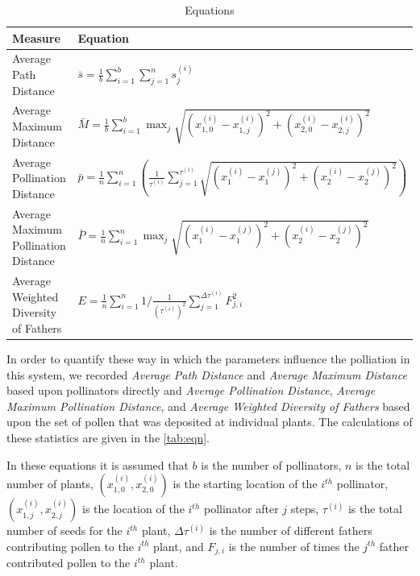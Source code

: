 \begin{table}[h]
\setlength{\extrarowheight}{10pt}
{\footnotesize
\begin{tabular}{|l|l|}
  \hline
  Measure & Equation \\[8pt] \hline   \hline
  Average Path Distance & $\bar{s} = \frac{1}{b} \sum_{i=1}^b \sum_{j=1}^n s^{\left(i\right)}_j$ \\[8pt] \hline
  Average Maximum Distance & $ \bar{M} = \frac{1}{b} \sum_{i=1}^b \max_j \sqrt{\left(x^{\left(i\right)}_{1,0}
- x^{\left(i\right)}_{1,j}\right)^2 +
      \left(x^{\left(i\right)}_{2,0} -
x^{\left(i\right)}_{2,j}\right)^2}  $ \\[8pt] \hline
  Average Pollination Distance & $ \bar{p} = \frac{1}{n} \sum_{i=1}^{n} \left(
\frac{1}{\tau^{\left(i\right)}} \sum_{j=1}^{\tau^{\left(i\right)}}
\sqrt{\left(x^{\left(i\right)}_1 -
x^{\left(j\right)}_1\right)^2 + \left(x^{\left(i\right)}_2 -
    x^{\left(j\right)}_2\right)^2}
    \right)  $ \\[12pt]  \hline
  Average Maximum Pollination Distance & $ \bar{P} = \frac{1}{n} \sum_{i=1}^{n} \max_j \sqrt{\left(x^{\left(i\right)}_1 -
x^{\left(j\right)}_1\right)^2 + \left(x^{\left(i\right)}_2 -
    x^{\left(j\right)}_2\right)^2}$ \\[8pt]  \hline
  Average Weighted Diversity of Fathers & $ E = \frac{1}{n} \sum_{i=1}^n 1/\frac{1}{\left(\tau^{\left(i\right)}\right)^2}
  \sum_{j=1}^{\Delta\tau^{\left(i\right)}} F^2_{j,i} $ \\[8pt]
  \hline
\end{tabular}
}
\caption{Equations}
\label{tab:eqn}
\end{table}

In order to quantify these way in which the parameters influence the polliation
in this system, we recorded \emph{Average Path Distance} and \emph{Average
Maximum Distance} based upon pollinators directly and \emph{Average Pollination
Distance}, \emph{Average Maximum Pollination Distance}, and \emph{Average
Weighted Diversity of Fathers} based upon the set of pollen that was deposited
at individual plants.  The calculations of these statistics are given in the
\autoref{tab:eqn}.

In these equations it is assumed that $b$ is the number of pollinators, $n$ is
the total number of plants, $(x_{1,0}^{(i)},x_{2,0}^{(i)})$ is the starting
location of the $i^{th}$ pollinator, $(x_{1,j}^{(i)},x_{2,j}^{(i)})$ is the
location of the $i^{th}$ pollinator after $j$ steps, $\tau^{(i)}$ is the total
number of seeds for the $i^{th}$ plant, $\Delta\tau^{(i)}$ is the number of
different fathers contributing pollen to the $i^{th}$ plant, and $F_{j,i}$ is
the number of times the $j^{th}$ father contributed pollen to the $i^{th}$
plant.
